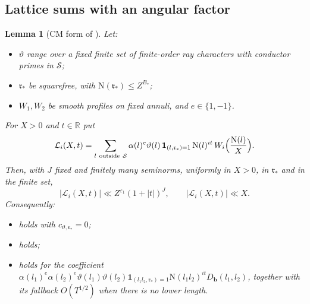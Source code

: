 \documentclass[11pt]{article}
\numberwithin{equation}{section}
\newcommand{\N}{\mathrm N}
\newcommand{\ind}{\mathbf1}
\newtheorem{lemma}{Lemma}
\begin{document}
\subsection{Lattice sums with an angular factor}\label{sec:s5-lattice}

\begin{lemma}[CM form of {\cite[Lemma~18.3]{OAI78}}]
\label{lem:s5-lattice}
Let:
\begin{itemize}
\item $\vartheta$ range over a fixed finite set of finite-order ray characters with conductor primes
 in $\mathcal S$;
\item $\mathfrak r_*$ be squarefree, with $\N(\mathfrak r_*)\le Z^{B_*}$;
\item $W_1,W_2$ be smooth profiles on fixed annuli, and $e\in\{1,-1\}$.
\end{itemize}
For $X>0$ and $t\in\mathbb R$ put
\begin{equation}\label{eq:d183}
 \mathcal L_i(X,t)=\sum_{l\ \text{outside}\ \mathcal S}\alpha(l)^e\vartheta(l)\,\ind_{(l,\mathfrak r_*)=1}\,
 \N(l)^{it}\,W_i\Bigl(\frac{\N(l)}X\Bigr).
\end{equation}
Then, with $J$ fixed and finitely many seminorms, uniformly in $X>0$, in $\mathfrak r_*$ and in the
finite set,
\begin{equation}\label{eq:s5-lattice}
 |\mathcal L_i(X,t)|\ll Z^{\varepsilon_1}(1+|t|)^J,\qquad|\mathcal L_i(X,t)|\ll X .
\end{equation}
Consequently:
\begin{itemize}
\item \cite[eq.~(18.45)]{OAI78} holds with $c_{\vartheta,\mathfrak r_*}=0$;
\item \cite[eq.~(18.46)]{OAI78} holds;
\item \cite[eq.~(18.47)]{OAI78} holds for the coefficient
 $\alpha(l_1)^e\alpha(l_2)^e\vartheta(l_1)\vartheta(l_2)\ind_{(l_1l_2,\mathfrak r_*)=1}\N(l_1l_2)^{it}D_{\mathbf b}(l_1,l_2)$,
 together with its fallback $O(T^{1/2})$ when there is no lower length.
\end{itemize}
\end{lemma}
\end{document}
